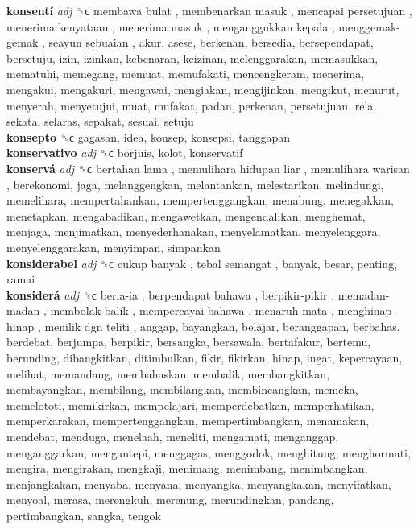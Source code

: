 \textbf{konsentí} \emph{adj}  ␝ϲ   membawa bulat ,  membenarkan masuk ,  mencapai persetujuan ,  menerima kenyataan ,  menerima masuk ,  menganggukkan kepala ,  menggemak-gemak ,  seayun sebuaian , akur, asese, berkenan, bersedia, bersependapat, bersetuju, izin, izinkan, kebenaran, keizinan, melenggarakan, memasukkan, mematuhi, memegang, memuat, memufakati, mencengkeram, menerima, mengakui, mengakuri, mengawai, mengiakan, mengijinkan, mengikut, menurut, menyerah, menyetujui, muat, mufakat, padan, perkenan, persetujuan, rela, sekata, selaras, sepakat, sesuai, setuju  \\
\textbf{konsepto} ␝ϲ  gagasan, idea, konsep, konsepsi, tanggapan  \\
\textbf{konservativo} \emph{adj}  ␝ϲ  borjuis, kolot, konservatif  \\
\textbf{konservá} \emph{adj}  ␝ϲ   bertahan lama ,  memulihara hidupan liar ,  memulihara warisan , berekonomi, jaga, melanggengkan, melantankan, melestarikan, melindungi, memelihara, mempertahankan, mempertenggangkan, menabung, menegakkan, menetapkan, mengabadikan, mengawetkan, mengendalikan, menghemat, menjaga, menjimatkan, menyederhanakan, menyelamatkan, menyelenggara, menyelenggarakan, menyimpan, simpankan  \\
\textbf{konsiderabel} \emph{adj}  ␝ϲ   cukup banyak ,  tebal semangat , banyak, besar, penting, ramai  \\
\textbf{konsiderá} \emph{adj}  ␝ϲ   beria-ia ,  berpendapat bahawa ,  berpikir-pikir ,  memadan-madan ,  membolak-balik ,  mempercayai bahawa ,  menaruh mata ,  menghinap-hinap ,  menilik dgn teliti , anggap, bayangkan, belajar, beranggapan, berbahas, berdebat, berjumpa, berpikir, bersangka, bersawala, bertafakur, bertemu, berunding, dibangkitkan, ditimbulkan, fikir, fikirkan, hinap, ingat, kepercayaan, melihat, memandang, membahaskan, membalik, membangkitkan, membayangkan, membilang, membilangkan, membincangkan, memeka, memelototi, memikirkan, mempelajari, memperdebatkan, memperhatikan, memperkarakan, mempertenggangkan, mempertimbangkan, menamakan, mendebat, menduga, menelaah, meneliti, mengamati, menganggap, menganggarkan, mengantepi, menggagas, menggodok, menghitung, menghormati, mengira, mengirakan, mengkaji, menimang, menimbang, menimbangkan, menjangkakan, menyaba, menyana, menyangka, menyangkakan, menyifatkan, menyoal, merasa, merengkuh, merenung, merundingkan, pandang, pertimbangkan, sangka, tengok  \\
